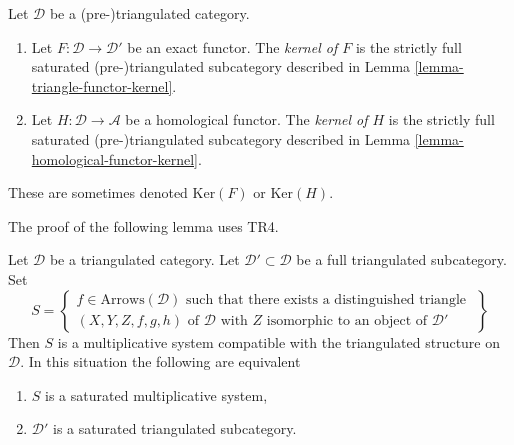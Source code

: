 \begin{definition}
\label{definition-kernel-category}
Let $\mathcal{D}$ be a (pre-)triangulated category.
\begin{enumerate}
\item Let $F : \mathcal{D} \to \mathcal{D}'$ be an exact functor.
The {\it kernel of $F$} is the strictly full saturated
(pre-)triangulated subcategory described in
Lemma \ref{lemma-triangle-functor-kernel}.
\item Let $H : \mathcal{D} \to \mathcal{A}$ be a homological functor.
The {\it kernel of $H$} is the strictly full saturated
(pre-)triangulated subcategory described in
Lemma \ref{lemma-homological-functor-kernel}.
\end{enumerate}
These are sometimes denoted $\text{Ker}(F)$ or $\text{Ker}(H)$.
\end{definition}

\noindent
The proof of the following lemma uses TR4.

\begin{lemma}
\label{lemma-construct-multiplicative-system}
Let $\mathcal{D}$ be a triangulated category.
Let $\mathcal{D}' \subset \mathcal{D}$ be a full triangulated
subcategory. Set
\begin{equation}
\label{equation-multiplicative-system}
S =
\left\{
\begin{matrix}
f \in \text{Arrows}(\mathcal{D})
\text{ such that there exists a distinguished triangle }\\
(X, Y, Z, f, g, h) \text{ of }\mathcal{D}\text{ with }
Z\text{ isomorphic to an object of }\mathcal{D}'
\end{matrix}
\right\}
\end{equation}
Then $S$ is a multiplicative system compatible with the triangulated
structure on $\mathcal{D}$. In this situation the following are equivalent
\begin{enumerate}
\item $S$ is a saturated multiplicative system,
\item $\mathcal{D}'$ is a saturated triangulated subcategory.
\end{enumerate}
\end{lemma}

